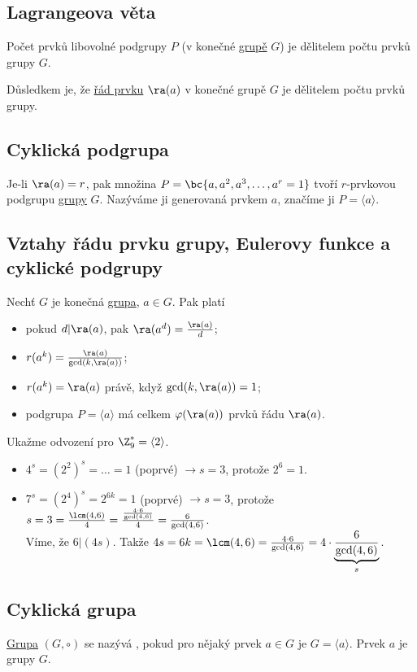 \subsection{Lagrangeova věta}\label{lagrange}
Počet prvků libovolné podgrupy $P$ (v konečné \hyperref[grupa]{grupě} $G$) je dělitelem počtu prvků grupy $G$.

Důsledkem je, že \hyperref[radPrvku]{řád prvku} $\ra(a)$ v konečné grupě $G$ je dělitelem počtu prvků grupy.

\subsection{Cyklická podgrupa}
Je-li $\ra(a) = r$, pak množina $P = \bc{a, a^2, a^3, \dots, a^r = 1}$ tvoří $r$-prvkovou podgrupu \hyperref[grupa]{grupy} $G$. Nazýváme ji  generovaná prvkem $a$, značíme ji $P = \langle a \rangle$.

\subsection{Vztahy řádu prvku grupy, Eulerovy funkce a cyklické podgrupy}
Nechť $G$ je konečná \hyperref[grupa]{grupa}, $a \in G$. Pak platí
\vspace{-1em}
\begin{itemize}
	\item pokud $d | \ra(a)$, pak $\ra(a^d) = \frac{\ra(a)}{d}$;
	\item $r(a^k) = \frac{\ra(a)}{\gcd(k, \ra(a))}$;
	\item $r(a^k) = \ra(a)$ právě, když $\gcd(k, \ra(a)) = 1$;
	\item podgrupa $P = \langle a \rangle$ má celkem $\varphi(\ra(a))$ prvků řádu $\ra(a)$.
\end{itemize}
Ukažme odvození pro $\Z_9^* = \langle 2 \rangle$.
\begin{itemize}
	\item $4^s = (2^2)^s = \dots = 1$ (poprvé) $\rightarrow s=3$, protože $2^6 = 1$.
	\item $7^s = (2^4)^s = 2^{6k} = 1$ (poprvé) $\rightarrow s=3$, protože $s = 3 = \frac{\lcm(4,6)}{4} = \frac{\frac{4 \cdot 6}{\gcd(4,6)}}{4}= \frac{6}{\gcd(4,6)}$.\\
	Víme, že $6 | (4s)$. Takže $4s = 6k = \lcm(4,6) = \frac{4 \cdot 6}{\gcd(4,6)} = 4 \cdot \underbrace{\frac{6}{\gcd(4,6)}}_{s}$.
\end{itemize}

\subsection{Cyklická grupa}\label{cyklGrupa}\label{generator}
\hyperref[grupa]{Grupa} $(G, \circ)$ se nazývá , pokud pro nějaký prvek $a \in G$ je $G = \langle a \rangle$. Prvek $a$ je  grupy $G$.

